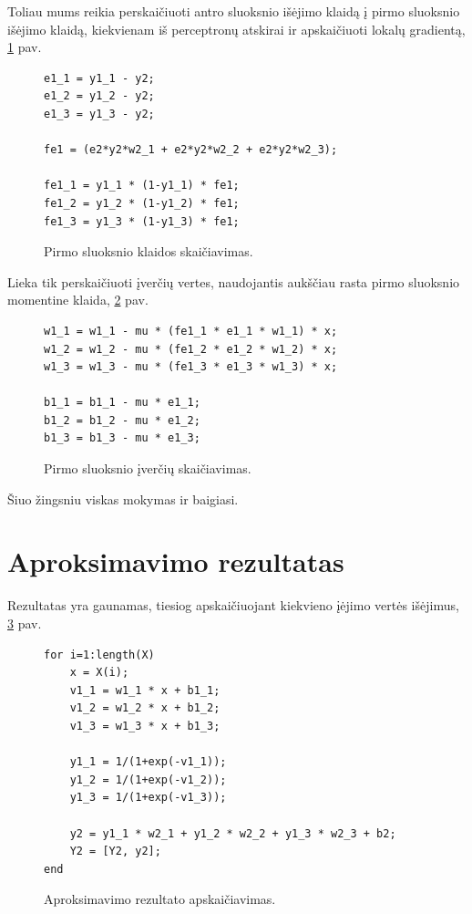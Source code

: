 \documentclass[11pt, a4paper, lithuanian]{article}
\begin{document}
    Toliau mums reikia perskaičiuoti antro sluoksnio išėjimo klaidą į pirmo sluoksnio išėjimo klaidą, kiekvienam iš perceptronų atskirai ir apskaičiuoti lokalų gradientą, \ref{code:pirmo_sluoksnio_klaidos_skaiciavimas} pav.

    \begin{figure}[h]
      \centering
      \caption{Pirmo sluoksnio klaidos skaičiavimas.}
      \label{code:pirmo_sluoksnio_klaidos_skaiciavimas}
      \begin{lstlisting}
e1_1 = y1_1 - y2;
e1_2 = y1_2 - y2;
e1_3 = y1_3 - y2;

fe1 = (e2*y2*w2_1 + e2*y2*w2_2 + e2*y2*w2_3);

fe1_1 = y1_1 * (1-y1_1) * fe1;
fe1_2 = y1_2 * (1-y1_2) * fe1;
fe1_3 = y1_3 * (1-y1_3) * fe1;
      \end{lstlisting}
    \end{figure}

    Lieka tik perskaičiuoti įverčių vertes, naudojantis aukščiau rasta pirmo sluoksnio momentine klaida, \ref{code:pirmo_sluoksnio_iverciu_skaiciavimas} pav.

    \begin{figure}[h]
      \centering
      \caption{Pirmo sluoksnio įverčių skaičiavimas.}
      \label{code:pirmo_sluoksnio_iverciu_skaiciavimas}
      \begin{lstlisting}
w1_1 = w1_1 - mu * (fe1_1 * e1_1 * w1_1) * x;
w1_2 = w1_2 - mu * (fe1_2 * e1_2 * w1_2) * x;
w1_3 = w1_3 - mu * (fe1_3 * e1_3 * w1_3) * x;

b1_1 = b1_1 - mu * e1_1;
b1_2 = b1_2 - mu * e1_2;
b1_3 = b1_3 - mu * e1_3;
      \end{lstlisting}
    \end{figure}

    Šiuo žingsniu viskas mokymas ir baigiasi.


    \section{Aproksimavimo rezultatas}

    Rezultatas yra gaunamas, tiesiog apskaičiuojant kiekvieno įėjimo vertės išėjimus, \ref{code:aproksimavimo_rezultato_apskaiciavimas} pav.

    \begin{figure}[h]
      \centering
      \caption{Aproksimavimo rezultato apskaičiavimas.}
      \label{code:aproksimavimo_rezultato_apskaiciavimas}
      \begin{lstlisting}
for i=1:length(X)
    x = X(i);
    v1_1 = w1_1 * x + b1_1;
    v1_2 = w1_2 * x + b1_2;
    v1_3 = w1_3 * x + b1_3;

    y1_1 = 1/(1+exp(-v1_1));
    y1_2 = 1/(1+exp(-v1_2));
    y1_3 = 1/(1+exp(-v1_3));

    y2 = y1_1 * w2_1 + y1_2 * w2_2 + y1_3 * w2_3 + b2;
    Y2 = [Y2, y2];
end
      \end{lstlisting}
    \end{figure}
\end{document}
